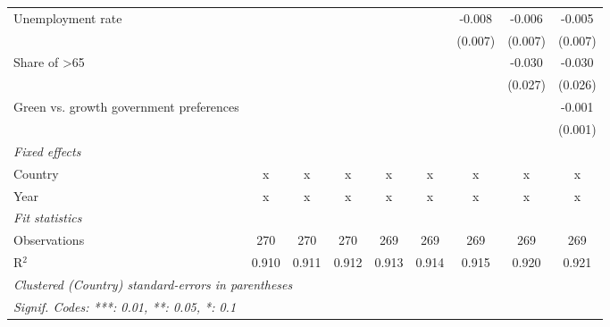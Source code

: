 \begin{table}[htbp]
\begin{tabular}{lcccccccc}
      Unemployment rate                                       &         &         &         &         &         & -0.008  & -0.006  & -0.005\\   
                                                              &         &         &         &         &         & (0.007) & (0.007) & (0.007)\\   
      Share of >65                                            &         &         &         &         &         &         & -0.030  & -0.030\\   
                                                              &         &         &         &         &         &         & (0.027) & (0.026)\\   
      Green vs. growth government preferences                 &         &         &         &         &         &         &         & -0.001\\   
                                                              &         &         &         &         &         &         &         & (0.001)\\   
      \emph{Fixed effects}\\
      Country                                                 & x       & x       & x       & x       & x       & x       & x       & x\\  
      Year                                                    & x       & x       & x       & x       & x       & x       & x       & x\\  
      \midrule \emph{Fit statistics}\\
      Observations                                            & 270     & 270     & 270     & 269     & 269     & 269     & 269     & 269\\  
      R$^2$                                                   & 0.910   & 0.911   & 0.912   & 0.913   & 0.914   & 0.915   & 0.920   & 0.921\\  
      \midrule
      \multicolumn{9}{l}{\emph{Clustered (Country) standard-errors in parentheses}}\\
      \multicolumn{9}{l}{\emph{Signif. Codes: ***: 0.01, **: 0.05, *: 0.1}}\\
   \end{tabular}
\end{table}


